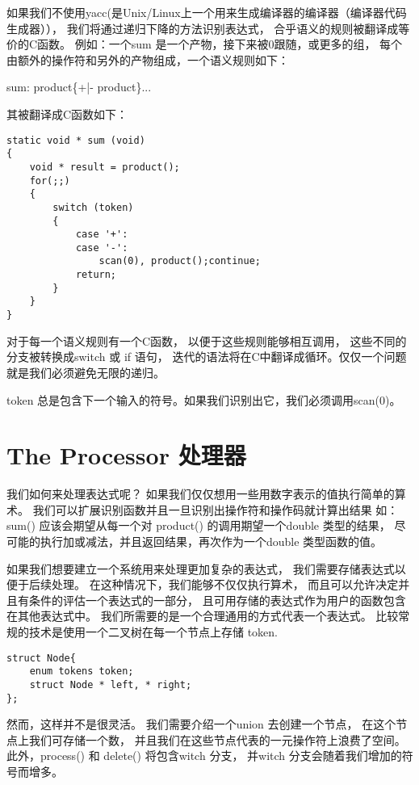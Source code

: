 如果我们不使用yacc(是Unix/Linux上一个用来生成编译器的编译器（编译器代码生成器）），
我们将通过递归下降的方法识别表达式，
合乎语义的规则被翻译成等价的C函数。
例如：一个sum 是一个产物，接下来被0跟随，或更多的组，
每个由额外的操作符和另外的产物组成，一个语义规则如下：

\begin{center}
sum: product\{+|- product\}...
\end{center}

其被翻译成C函数如下：

\begin{lstlisting}
static void * sum (void)
{
    void * result = product();
    for(;;)
    {
        switch (token)
        {
            case '+':
            case '-':
                scan(0), product();continue;
            return;
        }
    }
}
\end{lstlisting}

对于每一个语义规则有一个C函数，
以便于这些规则能够相互调用，
这些不同的分支被转换成switch 或 if 语句，
迭代的语法将在C中翻译成循环。仅仅一个问题就是我们必须避免无限的递归。

token 总是包含下一个输入的符号。如果我们识别出它，我们必须调用scan(0)。

\section{The Processor 处理器}
我们如何来处理表达式呢？
如果我们仅仅想用一些用数字表示的值执行简单的算术。
我们可以扩展识别函数并且一旦识别出操作符和操作码就计算出结果
如：sum() 应该会期望从每一个对 product() 的调用期望一个double 类型的结果，
尽可能的执行加或减法，并且返回结果，再次作为一个double 类型函数的值。

如果我们想要建立一个系统用来处理更加复杂的表达式，
我们需要存储表达式以便于后续处理。
在这种情况下，我们能够不仅仅执行算术，
而且可以允许决定并且有条件的评估一个表达式的一部分，
且可用存储的表达式作为用户的函数包含在其他表达式中。
我们所需要的是一个合理通用的方式代表一个表达式。
比较常规的技术是使用一个二叉树在每一个节点上存储 token.
\begin{lstlisting}
struct Node{
    enum tokens token;
    struct Node * left, * right;
};
\end{lstlisting}

然而，这样并不是很灵活。
我们需要介绍一个union 去创建一个节点，
在这个节点上我们可存储一个数，
并且我们在这些节点代表的一元操作符上浪费了空间。
此外，process() 和 delete() 将包含witch 分支，
并witch 分支会随着我们增加的符号而增多。

